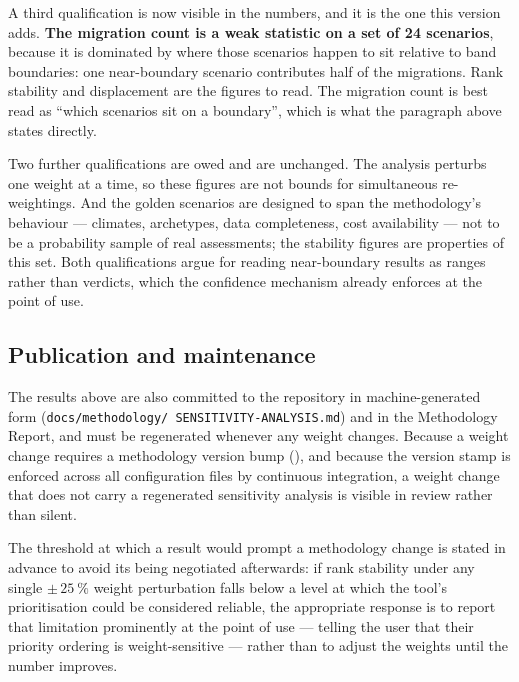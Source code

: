 A third qualification is now visible in the numbers, and it is the one this
version adds. \textbf{The migration count is a weak statistic on a set of
\num{24} scenarios}, because it is dominated by where those scenarios happen to
sit relative to band boundaries: one near-boundary scenario contributes half of
the migrations. Rank stability and displacement are the figures to read. The
migration count is best read as ``which scenarios sit on a boundary'', which is
what the paragraph above states directly.

Two further qualifications are owed and are unchanged. The analysis perturbs
one weight at a time, so these figures are not bounds for simultaneous
re-weightings. And the golden scenarios are designed to span the methodology's
behaviour --- climates, archetypes, data completeness, cost availability ---
not to be a probability sample of real assessments; the stability figures are
properties of this set. Both qualifications argue for reading near-boundary
results as ranges rather than verdicts, which the confidence mechanism already
enforces at the point of use.

\subsection{Publication and maintenance}

The results above are also committed to the repository in machine-generated
form (\texttt{docs/\allowbreak methodology/\allowbreak
SENSITIVITY-\allowbreak ANALYSIS.md}) and in the Methodology Report, and must
be regenerated whenever any weight changes. Because a
weight change requires a methodology version bump
(), and because the version stamp is enforced across all
configuration files by continuous integration, a weight change that does not
carry a regenerated sensitivity analysis is visible in review rather than
silent.

The threshold at which a result would prompt a methodology change is stated in
advance to avoid its being negotiated afterwards: if rank stability under any
single $\pm\,\SI{25}{\percent}$ weight perturbation falls below a level at
which the tool's prioritisation could be considered reliable, the appropriate
response is to report that limitation prominently at the point of use ---
telling the user that their priority ordering is weight-sensitive --- rather
than to adjust the weights until the number improves.
